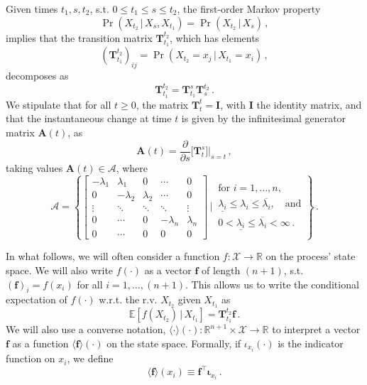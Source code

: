 \documentclass[10pt]{article}
\begin{document}
Given times $t_1,s,t_2$, s.t. $0\leq t_1\leq s\leq t_2$, the first-order Markov property
\begin{equation*}
\Pr(X_{t_2}\,\vert\,X_s,X_{t_1}) = \Pr(X_{t_2}\,\vert\,X_{s})\,,
\end{equation*}
implies that the transition matrix $\mathbf{T}_{t_1}^{t_2}$, which has elements
\begin{equation*}
(\mathbf{T}_{t_1}^{t_2})_{ij}=\Pr(X_{t_2}=x_j\,\vert\,X_{t_1}=x_i)\,,
\end{equation*}
decomposes as
\begin{equation*}
\mathbf{T}_{t_1}^{t_2}=\mathbf{T}_{t_1}^s\mathbf{T}_s^{t_2}\,.
\end{equation*}
We stipulate that for all $t\geq 0$, the matrix $\mathbf{T}_t^t=\mathbf{I}$, with $\mathbf{I}$ the identity matrix, and that the instantaneous change at time $t$ is given by the infinitesimal generator matrix $\mathbf{A}(t)$, as
\begin{equation*}
\mathbf{A}(t)=\frac{\partial}{\partial s}\bigl[\mathbf{T}_{t}^{s}\bigr]\Big\vert_{s=t}\,,
\end{equation*}
taking values $\mathbf{A}(t)\in\mathcal{A}$, where
\begin{equation*}
\mathcal{A} = \left\{\left[\begin{array}{ccccc}
-\lambda_1 & \lambda_1 & 0 & \cdots & 0 \\
0 & -\lambda_2 & \lambda_2 & \cdots & 0 \\
\vdots & \ddots & \ddots & \ddots & \vdots \\
0 & \cdots & 0 & -\lambda_n & \lambda_n \\
0 & \cdots & 0 & 0 & 0
\end{array}\right]\,\Bigg\vert\, \begin{array}{l}
\text{for }i=1,\ldots,n, \\
\underline{\lambda_i} \leq \lambda_i \leq \overline{\lambda_i}, \quad\text{and} \\
0<\underline{\lambda_i}\leq\overline{\lambda_i}<\infty\,.\end{array} \right\}\,.
\end{equation*}

In what follows, we will often consider a function $f: \mathcal{X}\rightarrow\mathbb{R}$ on the process' state space. We will also write $f(\cdot)$ as a vector $\mathbf{f}$ of length $(n+1)$, s.t. $\left(\mathbf{f}\right)_i=f(x_i)$ for all $i=1,\ldots,(n+1)$. This allows us to write the conditional expectation of $f(\cdot)$ w.r.t. the r.v. $X_{t_2}$ given $X_{t_1}$ as
\begin{equation*}
\mathbb{E}[f(X_{t_2})\,\vert\,X_{t_1}] = \mathbf{T}_{t_1}^{t_2}\mathbf{f}\,.
\end{equation*}
We will also use a converse notation, $\langle\cdot\rangle(\cdot) : \mathbb{R}^{n+1}\times\mathcal{X}\rightarrow\mathbb{R}$ to interpret a vector $\mathbf{f}$ as a function $\langle\mathbf{f}\rangle(\cdot)$ on the state space. Formally, if $\iota_{x_i}(\cdot)$ is the indicator function on $x_i$, we define
\begin{equation*}
\langle\mathbf{f}\rangle(x_i)\equiv \mathbf{f}^\top \boldsymbol{\iota}_{x_i}\,.
\end{equation*}
\end{document}
